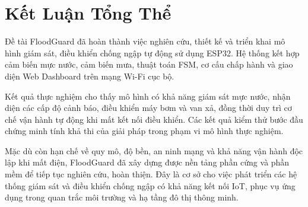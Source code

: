 \section{Kết Luận Tổng Thể}

Đề tài FloodGuard đã hoàn thành việc nghiên cứu, thiết kế và triển khai mô hình giám sát, điều khiển chống ngập tự động sử dụng ESP32. Hệ thống kết hợp cảm biến mực nước, cảm biến mưa, thuật toán FSM, cơ cấu chấp hành và giao diện Web Dashboard trên mạng Wi-Fi cục bộ.

Kết quả thực nghiệm cho thấy mô hình có khả năng giám sát mực nước, nhận diện các cấp độ cảnh báo, điều khiển máy bơm và van xả, đồng thời duy trì cơ chế vận hành tự động khi mất kết nối điều khiển. Các kết quả kiểm thử bước đầu chứng minh tính khả thi của giải pháp trong phạm vi mô hình thực nghiệm.

Mặc dù còn hạn chế về quy mô, độ bền, an ninh mạng và khả năng vận hành độc lập khi mất điện, FloodGuard đã xây dựng được nền tảng phần cứng và phần mềm để tiếp tục nghiên cứu, hoàn thiện. Đây là cơ sở cho việc phát triển các hệ thống giám sát và điều khiển chống ngập có khả năng kết nối IoT, phục vụ ứng dụng trong quan trắc môi trường và hạ tầng đô thị thông minh.
